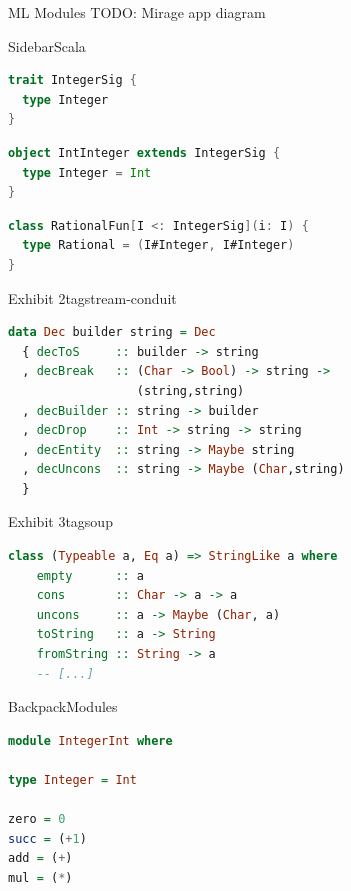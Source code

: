 \documentclass{beamer}
\begin{document}
\begin{frame}{ML Modules}
TODO: Mirage app diagram
\end{frame}

\begin{frame}[fragile]{Sidebar}{Scala}
\begin{lstlisting}[language=Scala,title=trait \textasciitilde\ signature]
trait IntegerSig {
  type Integer
}
\end{lstlisting}
\begin{lstlisting}[language=Scala,title=object \textasciitilde\ structure]
object IntInteger extends IntegerSig {
  type Integer = Int
}
\end{lstlisting}
\begin{lstlisting}[language=Scala,title=class \textasciitilde\ functor]
class RationalFun[I <: IntegerSig](i: I) {
  type Rational = (I#Integer, I#Integer)
}
\end{lstlisting}
\end{frame}

\begin{frame}[fragile]{Exhibit 2}{tagstream-conduit}
\begin{lstlisting}[language=Haskell]
data Dec builder string = Dec
  { decToS     :: builder -> string
  , decBreak   :: (Char -> Bool) -> string ->
                  (string,string)
  , decBuilder :: string -> builder
  , decDrop    :: Int -> string -> string
  , decEntity  :: string -> Maybe string
  , decUncons  :: string -> Maybe (Char,string)
  }
\end{lstlisting}
\end{frame}

\begin{frame}[fragile]{Exhibit 3}{tagsoup}
\begin{lstlisting}[language=Haskell]
class (Typeable a, Eq a) => StringLike a where
    empty      :: a
    cons       :: Char -> a -> a
    uncons     :: a -> Maybe (Char, a)
    toString   :: a -> String
    fromString :: String -> a
    -- [...]
\end{lstlisting}
\end{frame}

\begin{frame}[fragile]{Backpack}{Modules}
\begin{lstlisting}[language=Haskell]
module IntegerInt where

type Integer = Int

zero = 0
succ = (+1)
add = (+)
mul = (*)
\end{lstlisting}
\end{frame}
\end{document}
